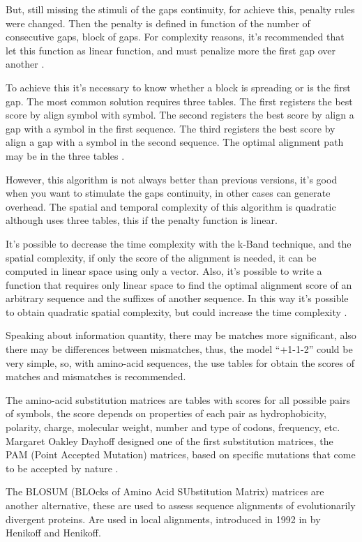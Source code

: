 \documentclass[journal]{IEEEtran}
\begin{document}
But, still missing the stimuli of the gaps continuity, for achieve this, penalty rules were changed. Then the penalty is defined in function of the number of consecutive gaps, block of gaps. For complexity reasons, it's recommended that let this function as linear function, and must penalize more the first gap over another \cite{gotoh1993align}.

To achieve this it's necessary to know whether a block is spreading or is the first gap. The most common solution requires three tables. The first registers the best score by align symbol with symbol. The second registers the best score by align a gap with a symbol in the first sequence. The third registers the best score by align a gap with a symbol in the second sequence. The optimal alignment path may be in the three tables \cite{gotoh1993align}.

However, this algorithm is not always better than previous versions, it's good when you want to stimulate the gaps continuity, in other cases can generate overhead. The spatial and temporal complexity of this algorithm is quadratic although uses three tables, this if the penalty function is linear.

It's possible to decrease the time complexity with the k-Band technique, and the spatial complexity, if only the score of the alignment is needed, it can be computed in linear space using only a vector. Also, it's possible to write a function that requires only linear space to find the optimal alignment score of an arbitrary sequence and the suffixes  of another sequence. In this way it's possible to obtain quadratic spatial complexity, but could increase the time complexity \cite{hirschberg1975align}.

Speaking about information quantity, there may be matches more significant, also there may be differences between mismatches, thus, the model ``+1-1-2'' could be very simple, so, with amino-acid sequences, the use tables for obtain the scores of matches and mismatches is recommended.

The amino-acid substitution matrices are tables with scores for all possible pairs of symbols, the score depends on properties of each pair as hydrophobicity, polarity, charge, molecular weight, number and type of codons, frequency, etc. Margaret Oakley Dayhoff designed one of the first substitution matrices, the PAM (Point Accepted Mutation) matrices, based on specific mutations that come to be accepted by nature \cite{dayhoff1978align}.

The BLOSUM (BLOcks of Amino Acid SUbstitution Matrix) matrices are another alternative, these are used to assess sequence alignments of evolutionarily divergent proteins. Are used in local alignments, introduced in 1992 in \cite{henikoff1992align} by Henikoff and Henikoff.
\end{document}
